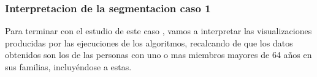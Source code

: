 
	\subsubsection[Interpretacion de la segmentacion caso 1]{Interpretacion de la segmentacion caso 1}

	Para terminar con el estudio de este caso , vamos a interpretar las visualizaciones producidas
	por las ejecuciones de los algoritmos, recalcando de que los datos obtenidos son los de las personas con uno o mas
	miembros mayores de 64 años en sus familias, incluyéndose a estas. \\

